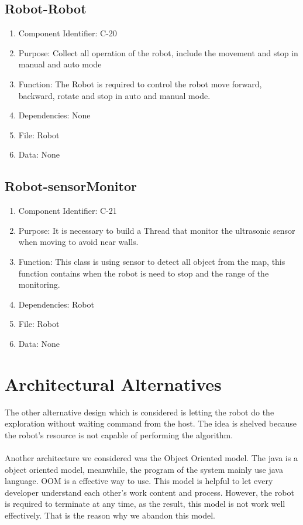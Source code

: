 \documentclass[11pt, a4paper]{report}
\begin{document}
\subsection{Robot-Robot}
\begin{enumerate}
\item Component Identifier: C-20
\item Purpose: Collect all operation of the robot, include the movement and stop in manual and auto mode
\item Function: The Robot is required to control the robot move forward, backward, rotate and stop in auto and manual mode.
\item Dependencies: None
\item File: Robot
\item Data: None
\end{enumerate}

\subsection{Robot-sensorMonitor}
\begin{enumerate}
\item Component Identifier: C-21
\item Purpose: It is necessary to build  a Thread that monitor the ultrasonic sensor when moving to avoid near walls. 
 \item Function: This class is using sensor to detect all object from the map, this function contains when the robot is need to stop and the range of the monitoring.
\item Dependencies: Robot
\item File: Robot
\item Data: None
\end{enumerate}



\section{Architectural Alternatives}
The other alternative design which is considered is letting the robot do the exploration without
waiting command from the host. The idea is shelved because the robot's resource is not capable
of performing the  algorithm.\\ \\
Another architecture we considered was the Object Oriented model. The java is a object oriented model, meanwhile, the program of the system mainly use java language. OOM is a effective way to use. This model is helpful to let every developer understand each other's work content and process. However, the robot is required to terminate at any time, as the result, this model is not work well effectively. That is the reason why we abandon this model.
\end{document}
